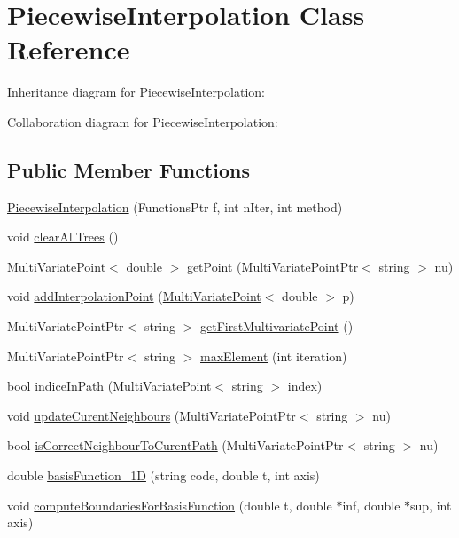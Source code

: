 \hypertarget{class_piecewise_interpolation}{}\section{Piecewise\+Interpolation Class Reference}
\label{class_piecewise_interpolation}


Inheritance diagram for Piecewise\+Interpolation\+:


Collaboration diagram for Piecewise\+Interpolation\+:
\subsection*{Public Member Functions}
\begin{DoxyCompactItemize}
\item 
\hyperlink{class_piecewise_interpolation_a163e201afb9f7f73e19bc8273895444c}{Piecewise\+Interpolation} (Functions\+Ptr f, int n\+Iter, int method)
\item 
void \hyperlink{class_piecewise_interpolation_a2470a7df8440b7c8b8394392f16773a0}{clear\+All\+Trees} ()
\item 
\hyperlink{class_multi_variate_point}{Multi\+Variate\+Point}$<$ double $>$ \hyperlink{class_piecewise_interpolation_a12e8daf16807946c6a030844ac7bfdb1}{get\+Point} (Multi\+Variate\+Point\+Ptr$<$ string $>$ nu)
\item 
void \hyperlink{class_piecewise_interpolation_a7f07e4dee313c9da21876b286af62336}{add\+Interpolation\+Point} (\hyperlink{class_multi_variate_point}{Multi\+Variate\+Point}$<$ double $>$ p)
\item 
Multi\+Variate\+Point\+Ptr$<$ string $>$ \hyperlink{class_piecewise_interpolation_adc4d6a1ada2e8f4d3f2176d4ebcb31a4}{get\+First\+Multivariate\+Point} ()
\item 
Multi\+Variate\+Point\+Ptr$<$ string $>$ \hyperlink{class_piecewise_interpolation_a0c0c51e2eed0a0f7155bc223adf30cf8}{max\+Element} (int iteration)
\item 
bool \hyperlink{class_piecewise_interpolation_ac9a4902bf9202aa7a0b84260d2380898}{indice\+In\+Path} (\hyperlink{class_multi_variate_point}{Multi\+Variate\+Point}$<$ string $>$ index)
\item 
void \hyperlink{class_piecewise_interpolation_a4696cd4a9be92614779f53d17acd0ad1}{update\+Curent\+Neighbours} (Multi\+Variate\+Point\+Ptr$<$ string $>$ nu)
\item 
bool \hyperlink{class_piecewise_interpolation_ac0b6901bd4b71cc35d3b121f31b4bc53}{is\+Correct\+Neighbour\+To\+Curent\+Path} (Multi\+Variate\+Point\+Ptr$<$ string $>$ nu)
\item 
double \hyperlink{class_piecewise_interpolation_abd0d1ee7206ec28ce53b57a01d430458}{basis\+Function\+\_\+1D} (string code, double t, int axis)
\item 
void \hyperlink{class_piecewise_interpolation_a5d45e9742f492e96686c51769766eed1}{compute\+Boundaries\+For\+Basis\+Function} (double t, double $\ast$inf, double $\ast$sup, int axis)
\end{DoxyCompactItemize}
